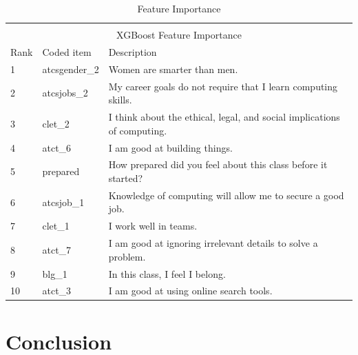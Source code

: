 \setlength{\extrarowheight}{1.5pt}
\begin{table}[!htbp]
\caption{Feature Importance} %
\centering %
\begin{tabular}{|l|l|p{10cm}|} %
\hline %


\multicolumn{3}{|c|}{}\\
\multicolumn{3}{|c|}{XGBoost Feature Importance}\\[5pt]
\hline
Rank & Coded item & Description\\[0.5ex]
\hline %

1 & atcsgender\_2 &  Women are smarter than men. \\
2 & atcsjobs\_2 & My career goals do not require that I learn computing skills. \\
3 & clet\_2 &  I think about the ethical, legal, and social implications of computing.\\
4 & atct\_6 & I am good at building things.\\
5 & prepared & How prepared did you feel about this class before it started? \\
6 & atcsjob\_1 & Knowledge of computing will allow me to secure a good job. \\
7 & clet\_1 & I work well in teams. \\
8 & atct\_7 & I am good at ignoring irrelevant details to solve a problem. \\
9 & blg\_1 & In this class, I feel I belong. \\
10 & atct\_3 &  I am good at using online search tools. \\

\hline%
\end{tabular}
\label{tableFeatureImportance}{}
\end{table}


\chapter*{Conclusion}

